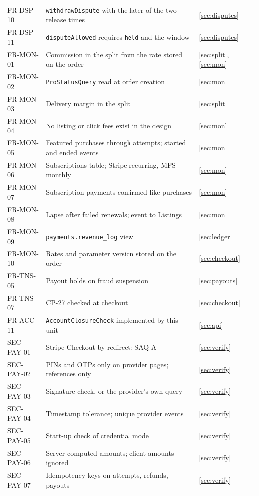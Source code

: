 \documentclass[11pt,a4paper]{article}
\begin{document}
{\begin{longtable}{@{}>{\ttfamily}p{2.4cm}>{\raggedright\arraybackslash}p{10.6cm}>{\raggedright\arraybackslash}p{2.2cm}@{}}
FR-DSP-10 & \texttt{withdrawDispute} with the later of the two release times & \ref{sec:disputes} \\
FR-DSP-11 & \texttt{disputeAllowed} requires \texttt{held} and the window & \ref{sec:disputes} \\
FR-MON-01 & Commission in the split from the rate stored on the order & \ref{sec:split}, \ref{sec:mon} \\
FR-MON-02 & \texttt{ProStatusQuery} read at order creation & \ref{sec:mon} \\
FR-MON-03 & Delivery margin in the split & \ref{sec:split} \\
FR-MON-04 & No listing or click fees exist in the design & \ref{sec:mon} \\
FR-MON-05 & Featured purchases through attempts; started and ended events & \ref{sec:mon} \\
FR-MON-06 & Subscriptions table; Stripe recurring, MFS monthly & \ref{sec:mon} \\
FR-MON-07 & Subscription payments confirmed like purchases & \ref{sec:mon} \\
FR-MON-08 & Lapse after failed renewals; event to Listings & \ref{sec:mon} \\
FR-MON-09 & \texttt{payments.revenue\_log} view & \ref{sec:ledger} \\
FR-MON-10 & Rates and parameter version stored on the order & \ref{sec:checkout} \\
FR-TNS-05 & Payout holds on fraud suspension & \ref{sec:payouts} \\
FR-TNS-07 & CP-27 checked at checkout & \ref{sec:checkout} \\
FR-ACC-11 & \texttt{AccountClosureCheck} implemented by this unit & \ref{sec:api} \\
SEC-PAY-01 & Stripe Checkout by redirect: SAQ A & \ref{sec:verify} \\
SEC-PAY-02 & PINs and OTPs only on provider pages; references only & \ref{sec:verify} \\
SEC-PAY-03 & Signature check, or the provider's own query & \ref{sec:verify} \\
SEC-PAY-04 & Timestamp tolerance; unique provider events & \ref{sec:verify} \\
SEC-PAY-05 & Start-up check of credential mode & \ref{sec:verify} \\
SEC-PAY-06 & Server-computed amounts; client amounts ignored & \ref{sec:verify} \\
SEC-PAY-07 & Idempotency keys on attempts, refunds, payouts & \ref{sec:verify} \\

\end{longtable}}
\end{document}
